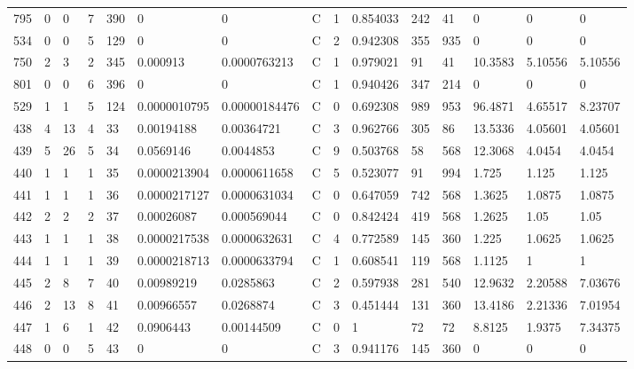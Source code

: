 \begin{latin}
\begin{longtable}{lllllllllllllll}
	795 & 0  & 0   & 7  & 390 & 0              & 0              & C & 1  & 0.854033 & 242  & 41   & 0       & 0       & 0       \\
	534 & 0  & 0   & 5  & 129 & 0              & 0              & C & 2  & 0.942308 & 355  & 935  & 0       & 0       & 0       \\
	750 & 2  & 3   & 2  & 345 & 0.000913       & 0.0000763213   & C & 1  & 0.979021 & 91   & 41   & 10.3583 & 5.10556 & 5.10556 \\
	801 & 0  & 0   & 6  & 396 & 0              & 0              & C & 1  & 0.940426 & 347  & 214  & 0       & 0       & 0       \\
	529 & 1  & 1   & 5  & 124 & 0.0000010795   & 0.00000184476  & C & 0  & 0.692308 & 989  & 953  & 96.4871 & 4.65517 & 8.23707 \\
	438 & 4  & 13  & 4  & 33  & 0.00194188     & 0.00364721     & C & 3  & 0.962766 & 305  & 86   & 13.5336 & 4.05601 & 4.05601 \\
	439 & 5  & 26  & 5  & 34  & 0.0569146      & 0.0044853      & C & 9  & 0.503768 & 58   & 568  & 12.3068 & 4.0454  & 4.0454  \\
	440 & 1  & 1   & 1  & 35  & 0.0000213904   & 0.0000611658   & C & 5  & 0.523077 & 91   & 994  & 1.725   & 1.125   & 1.125   \\
	441 & 1  & 1   & 1  & 36  & 0.0000217127   & 0.0000631034   & C & 0  & 0.647059 & 742  & 568  & 1.3625  & 1.0875  & 1.0875  \\
	442 & 2  & 2   & 2  & 37  & 0.00026087     & 0.000569044    & C & 0  & 0.842424 & 419  & 568  & 1.2625  & 1.05    & 1.05    \\
	443 & 1  & 1   & 1  & 38  & 0.0000217538   & 0.0000632631   & C & 4  & 0.772589 & 145  & 360  & 1.225   & 1.0625  & 1.0625  \\
	444 & 1  & 1   & 1  & 39  & 0.0000218713   & 0.0000633794   & C & 1  & 0.608541 & 119  & 568  & 1.1125  & 1       & 1       \\
	445 & 2  & 8   & 7  & 40  & 0.00989219     & 0.0285863      & C & 2  & 0.597938 & 281  & 540  & 12.9632 & 2.20588 & 7.03676 \\
	446 & 2  & 13  & 8  & 41  & 0.00966557     & 0.0268874      & C & 3  & 0.451444 & 131  & 360  & 13.4186 & 2.21336 & 7.01954 \\
	447 & 1  & 6   & 1  & 42  & 0.0906443      & 0.00144509     & C & 0  & 1        & 72   & 72   & 8.8125  & 1.9375  & 7.34375 \\
	448 & 0  & 0   & 5  & 43  & 0              & 0              & C & 3  & 0.941176 & 145  & 360  & 0       & 0       & 0       \\

\end{longtable}
\end{latin}
